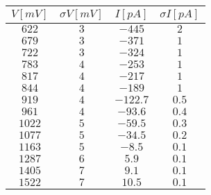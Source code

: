 \begin{tabular}{cccc}
\hline
	$V[mV]$ & $\sigma V[mV]$ & $I[pA]$ & $\sigma I[pA]$\\ 
\hline
	$622$ & $3$ & $-445$ & $2$ \\
	$679$ & $3$ & $-371$ & $1$ \\
	$722$ & $3$ & $-324$ & $1$ \\
	$783$ & $4$ & $-253$ & $1$ \\
	$817$ & $4$ & $-217$ & $1$ \\
	$844$ & $4$ & $-189$ & $1$ \\
	$919$ & $4$ & $-122.7$ & $0.5$ \\
	$961$ & $4$ & $-93.6$ & $0.4$ \\
	$1022$ & $5$ & $-59.5$ & $0.3$ \\
	$1077$ & $5$ & $-34.5$ & $0.2$ \\
	$1163$ & $5$ & $-8.5$ & $0.1$ \\
	$1287$ & $6$ & $5.9$ & $0.1$ \\
	$1405$ & $7$ & $9.1$ & $0.1$ \\
	$1522$ & $7$ & $10.5$ & $0.1$ \\
\hline
\end{tabular}
